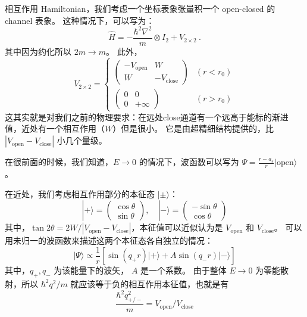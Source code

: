 
相互作用 Hamiltonian，我们考虑一个坐标表象张量积一个 open-closed 的 channel 表象。 这种情况下，可以写为：
\begin{equation}
\hat{H} = -\frac{\hbar^2\nabla^2}{m}\otimes I_2+V_{2\times2}~.
\end{equation}
其中因为约化所以 $2m\to m$。 此外，
\begin{equation}
V_{2\times2} = \begin{cases}
\left(\begin{matrix}
-V_{\text{open}} & W\\
W & -V_{\text{close}}
\end{matrix}\right) & (r < r_0)\\
\left(\begin{matrix}
0 & 0\\
0 & +\infty
\end{matrix}\right) & (r > r_0)
\end{cases} 
\end{equation}
这其实就是对我们之前的物理要求：在远处close通道有一个远高于能标的渐进值，近处有一个相互作用（$W$）但是很小。 它是由超精细结构提供的，比 $|V_{\text{open}}-V_{\text{close}}|$ 小几个量级。

在很前面的时候，我们知道，$E\to0$ 的情况下，波函数可以写为 $\Psi=\frac{r-a_s}{r}|\text{open}\rangle$。

在近处，我们考虑相互作用部分的本征态 $|\pm\rangle$：
\begin{equation}
|+\rangle = \left(\begin{matrix}\cos\theta\\\sin\theta\end{matrix}\right),\quad |-\rangle = \left(\begin{matrix}-\sin\theta\\\cos\theta\end{matrix}\right)
\end{equation}
其中，$\tan2\theta = 2W/|V_{\text{open}}-V_{\text{close}}|$，本征值可以近似认为是 $V_{\text{open}}$ 和 $V_{\text{close}}$。 可以用未归一的波函数来描述这两个本征态各自独立的情况：
\begin{equation}
|\Psi\rangle\propto\frac{1}{r}\left[\sin(q_+r)|+\rangle + A\sin(q_-r)|-\rangle\right]
\end{equation}
其中，$q_+,q_-$ 为该能量下的波矢， $A$ 是一个系数。 由于整体 $E\to0$ 为零能散射，所以 $\hbar^2q^2/m$ 就应该等于负的相互作用本征值，也就是有
\begin{equation}
\frac{\hbar^2q_{+/-}^2}{m} = V_{\text{open}}/V_{\text{close}}
\end{equation}

